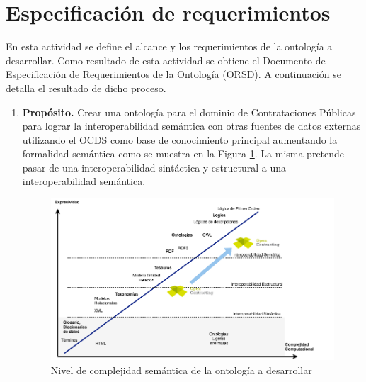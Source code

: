 \section{Especificación de requerimientos}

En esta actividad se define el alcance y los requerimientos de la ontología a desarrollar. Como resultado de esta actividad se obtiene el Documento de Especificación de Requerimientos de la Ontología (ORSD). A continuación se detalla el resultado de dicho proceso.
\begin{enumerate}
\item \textbf{Propósito.} Crear una ontología para el dominio de Contrataciones Públicas para lograr la interoperabilidad semántica con otras fuentes de datos externas utilizando el OCDS como base de conocimiento principal aumentando la formalidad semántica como se muestra en la Figura \ref{img:ocds-ocntology-complejidad}. La misma pretende pasar de una interoperabilidad sintáctica y estructural a una interoperabilidad semántica.

\begin{figure}[htbp!]
\centering
\includegraphics[width=150mm]{figuras/Diagramas-OenContracting.png}
\caption{Nivel de complejidad semántica de la ontología a desarrollar}
\label{img:ocds-ocntology-complejidad}
\end{figure}



\end{enumerate}

